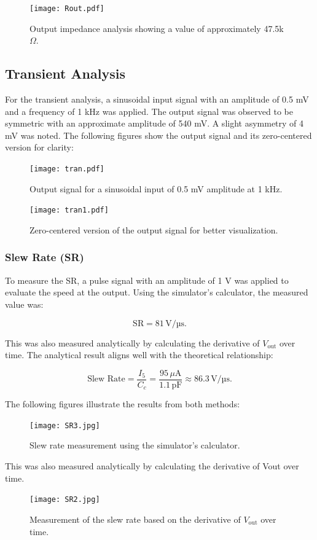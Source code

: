 \documentclass[12pt,a4paper]{article}
\begin{document}
\begin{figure}[H]
    \centering
    \texttt{[image: Rout.pdf]}
    \caption{Output impedance analysis showing a value of approximately 47.5k$\Omega$.}
    \label{fig:output_impedance}
\end{figure}
\pagebreak
\subsection*{Transient Analysis}

For the transient analysis, a sinusoidal input signal with an amplitude of 0.5 mV and a frequency of 1 kHz was applied. The output signal was observed to be symmetric with an approximate amplitude of 540 mV. A slight asymmetry of 4 mV was noted. The following figures show the output signal and its zero-centered version for clarity:

\begin{figure}[H]
    \centering
    \texttt{[image: tran.pdf]}
    \caption{Output signal for a sinusoidal input of 0.5 mV amplitude at 1 kHz.}
    \label{fig:tran}
\end{figure}

\begin{figure}[H]
    \centering
    \texttt{[image: tran1.pdf]}
    \caption{Zero-centered version of the output signal for better visualization.}
    \label{fig:tran1}
\end{figure}
\newpage
\subsubsection*{Slew Rate (SR)}

To measure the SR, a pulse signal with an amplitude of 1 V was applied to evaluate the speed at the output. Using the simulator's calculator, the measured value was:

\[
\text{SR} = 81 \, \text{V/µs}.
\]

This was also measured analytically by calculating the derivative of $V_{\text{out}}$ over time. The analytical result aligns well with the theoretical relationship:

\[
\text{Slew Rate} = \frac{I_5}{C_c} = \frac{95\, \mu \text{A}}{1.1\, \text{pF}} \approx 86.3 \, \text{V/µs}.
\]

The following figures illustrate the results from both methods:

\begin{figure}[H]
    \centering
    \texttt{[image: SR3.jpg]}
    \caption{Slew rate measurement using the simulator's calculator.}
    \label{fig:SR3}
\end{figure}
This was also measured analytically by calculating the derivative of Vout over time.
\begin{figure}[H]
    \centering
    \texttt{[image: SR2.jpg]}
    \caption{Measurement of the slew rate based on the derivative of $V_{\text{out}}$ over time.}
    \label{fig:SR2}
\end{figure}
\end{document}
